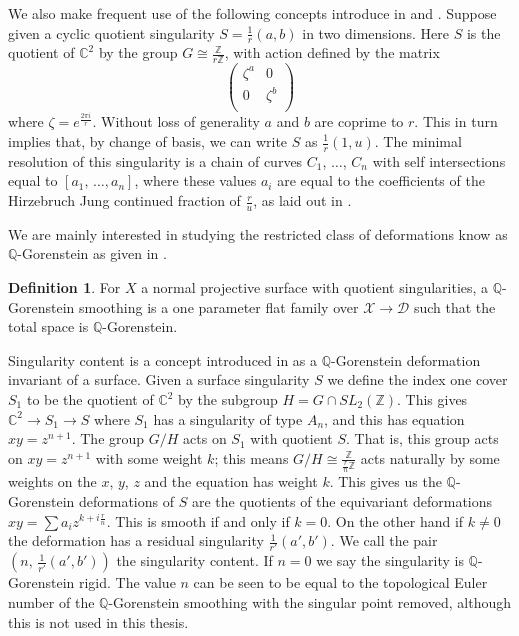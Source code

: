 \documentclass[12pt,a4paper]{book}      %
\theoremstyle{definition}
\newtheorem{dfn}[thm]{Definition}
\newcommand{\mb}[1]{\mathbb{#1}}
\newcommand{\ra}{\rightarrow}
\begin{document}
We also make frequent use of the following concepts introduce in \cite{Reid-cyclic} and \cite{SingContent}. Suppose given a cyclic quotient singularity $S=\frac{1}{r}(a,b)$ in two dimensions. Here $S$ is the quotient of $\mb{C}^2$ by the group $G \cong \frac{\mb{Z}}{r\mb{Z}}$, with action defined by the matrix
\[
\left(
\begin{array}{cc}
\zeta^a & 0 \\
0 & \zeta^b \\
\end{array}
\right)
\]
where $\zeta = e^{\frac{2 \pi i}{r}}$. Without loss of generality $a$ and $b$ are coprime to $r$. This in turn implies that, by change of basis, we can write $S$ as $\frac{1}{r}(1,u)$. The minimal resolution of this singularity is a chain of curves $C_1$, $\dots$, $C_n$ with self intersections equal to $[a_1,\, \dots , a_n]$, where these values $a_i$ are equal to the coefficients of the Hirzebruch Jung continued fraction of $\frac{r}{u}$, as laid out in \cite{Reid-cyclic}.


We are mainly interested in studying the restricted class of deformations know as $\mb{Q}$-Gorenstein as given in \cite{Kollar-SB}. 
\begin{dfn}
For $X$ a normal projective surface with quotient singularities, a $\mb{Q}$-Gorenstein smoothing is a one parameter flat family over $\mathcal{X} \ra \mathcal{D}$ such that the total space is $\mb{Q}$-Gorenstein.
\end{dfn}
Singularity content is a concept introduced in \cite{SingContent} as a $\mb{Q}$-Gorenstein deformation invariant of a surface. Given a surface singularity $S$ we define the index one cover $S_1$ to be the quotient of $\mb{C}^2$  by the subgroup $H = G \cap SL_2(\mb{Z})$. This gives $\mb{C}^2 \ra S_1 \ra S$ where $S_1$ has a singularity of type $A_n$, and this has equation $xy = z^{n+1}$. The group $G/H$ acts on $S_1$ with quotient $S$. That is, this group acts on $xy = z^{n+1}$ with some weight $k$; this means $G/H \cong \frac{\mb{Z}}{\frac{r}{n}\mb{Z}}$ acts naturally by  some weights on the $x$, $y$, $z$ and the equation has weight $k$. This gives us the $\mb{Q}$-Gorenstein deformations  of $S$ are  the quotients of the equivariant deformations $xy = \sum a_i z^{k + i\frac{r}{n}}$. This is smooth if and only if $k=0$. On the other hand if $k\neq 0$ the deformation has a residual singularity $\frac{1}{r'}(a', b')$. We call the pair $(n, \, \frac{1}{r'}(a', b')) $ the singularity content. If $n=0$ we say the singularity is $\mb{Q}$-Gorenstein rigid. The value $n$ can be seen to be equal to the topological Euler number of the $\mb{Q}$-Gorenstein smoothing with the singular point removed, although this is not used in this thesis.
\end{document}
